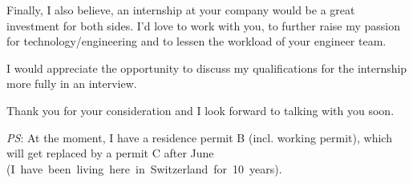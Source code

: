 \documentclass[11pt, a4paper]{awesome-cv}
\begin{document}
\begin{cvletter}

Finally, I also believe, an internship at your company would be a great investment for both sides.  I'd love to work with you, to further raise my passion for technology/engineering and to lessen the workload of your engineer team. 


I would appreciate the opportunity to discuss my qualifications for the internship more fully in an interview.  

Thank you for your consideration and I look forward to talking with you soon. 

\end{cvletter}

\makeletterclosing

\textit{PS}: At the moment, I have a residence permit B (incl. working permit), which will get replaced by a permit C after June \mbox{(I have been living here in Switzerland for 10 years).} 
\end{document}
